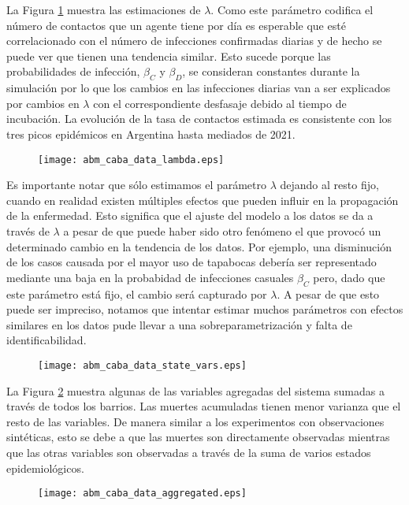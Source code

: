 La Figura \ref{fig:abm_caba_data_lambda} muestra las estimaciones de $\lambda$. Como este parámetro codifica el número de contactos que un agente tiene por día es esperable que esté correlacionado con el número de infecciones confirmadas diarias y de hecho se puede ver que tienen una tendencia similar. Esto sucede porque las probabilidades de infección, $\beta_C$ y $\beta_D$, se consideran constantes durante la simulación por lo que los cambios en las infecciones diarias van a ser explicados por cambios en $\lambda$ con el correspondiente desfasaje debido al tiempo de incubación. La evolución de la tasa de contactos estimada es consistente con los tres picos epidémicos en Argentina hasta mediados de 2021.
\begin{figure}[h]
    \centering
    \texttt{[image: abm\_caba\_data\_lambda.eps]}
    \caption{}
    \label{fig:abm_caba_data_lambda}
\end{figure}

Es importante notar que sólo estimamos el parámetro $\lambda$ dejando al resto fijo, cuando en realidad existen múltiples efectos que pueden influir en la propagación de la enfermedad. Esto significa que el ajuste del modelo a los datos se da a través de $\lambda$ a pesar de que puede haber sido otro fenómeno el que provocó un determinado cambio en la tendencia de los datos. Por ejemplo, una disminución de los casos causada por el mayor uso de tapabocas debería ser representado mediante una baja en la probabidad de infecciones casuales $\beta_C$ pero, dado que este parámetro está fijo, el cambio será capturado por $\lambda$. A pesar de que esto puede ser impreciso, notamos que intentar estimar muchos parámetros con efectos similares en los datos pude llevar a una sobreparametrización y falta de identificabilidad.
\begin{figure}[h]
    \centering
    \texttt{[image: abm\_caba\_data\_state\_vars.eps]}
    \caption{}
    \label{fig:abm_caba_data_state_vars}
\end{figure}

La Figura \ref{fig:abm_caba_data_state_vars} muestra algunas de las variables agregadas del sistema sumadas a través de todos los barrios. Las muertes acumuladas tienen menor varianza que el resto de las variables. De manera similar a los experimentos con observaciones sintéticas, esto se debe a que las muertes son directamente observadas mientras que las otras variables son observadas a través de la suma de varios estados epidemiológicos.
\begin{figure}[h]
    \centering
    \texttt{[image: abm\_caba\_data\_aggregated.eps]}
    \caption{}
    \label{fig:abm_caba_data_aggregated}
\end{figure}

